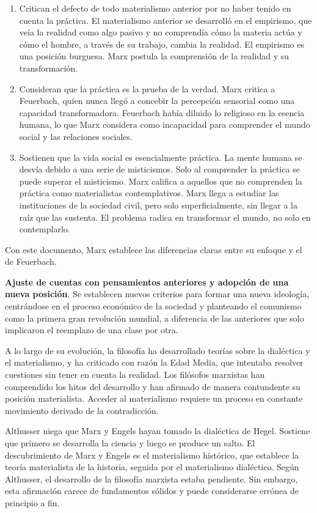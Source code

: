 \documentclass[
  jou,
  floatsintext,
  longtable,
  a4paper,
  nolmodern,
  notxfonts,
  notimes,
  12pt,
  colorlinks=true,linkcolor=blue,citecolor=blue,urlcolor=blue]{apa7}
\begin{document}
\begin{enumerate}
\def\labelenumi{\arabic{enumi}.}
\item
  Critican el defecto de todo materialismo anterior por no haber tenido
  en cuenta la práctica. El materialismo anterior se desarrolló en el
  empirismo, que veía la realidad como algo pasivo y no comprendía cómo
  la materia actúa y cómo el hombre, a través de su trabajo, cambia la
  realidad. El empirismo es una posición burguesa. Marx postula la
  comprensión de la realidad y su transformación.
\item
  Consideran que la práctica es la prueba de la verdad. Marx critica a
  Feuerbach, quien nunca llegó a concebir la percepción sensorial como
  una capacidad transformadora. Feuerbach había diluido lo religioso en
  la esencia humana, lo que Marx considera como incapacidad para
  comprender el mundo social y las relaciones sociales.
\item
  Sostienen que la vida social es esencialmente práctica. La mente
  humana se desvía debido a una serie de misticismos. Solo al comprender
  la práctica se puede superar el misticismo. Marx califica a aquellos
  que no comprenden la práctica como materialistas contemplativos. Marx
  llega a estudiar las instituciones de la sociedad civil, pero solo
  superficialmente, sin llegar a la raíz que las sustenta. El problema
  radica en transformar el mundo, no solo en contemplarlo.
\end{enumerate}

Con este documento, Marx establece las diferencias claras entre su
enfoque y el de Feuerbach.

\textbf{Ajuste de cuentas con pensamientos anteriores y adopción de una
nueva posición}. Se establecen nuevos criterios para formar una nueva
ideología, centrándose en el proceso económico de la sociedad y
planteando el comunismo como la primera gran revolución mundial, a
diferencia de las anteriores que solo implicaron el reemplazo de una
clase por otra.

A lo largo de su evolución, la filosofía ha desarrollado teorías sobre
la dialéctica y el materialismo, y ha criticado con razón la Edad Media,
que intentaba resolver cuestiones sin tener en cuenta la realidad. Los
filósofos marxistas han comprendido los hitos del desarrollo y han
afirmado de manera contundente su posición materialista. Acceder al
materialismo requiere un proceso en constante movimiento derivado de la
contradicción.

Althusser niega que Marx y Engels hayan tomado la dialéctica de Hegel.
Sostiene que primero se desarrolla la ciencia y luego se produce un
salto. El descubrimiento de Marx y Engels es el materialismo histórico,
que establece la teoría materialista de la historia, seguida por el
materialismo dialéctico. Según Althusser, el desarrollo de la filosofía
marxista estaba pendiente. Sin embargo, esta afirmación carece de
fundamentos sólidos y puede considerarse errónea de principio a fin.
\end{document}
